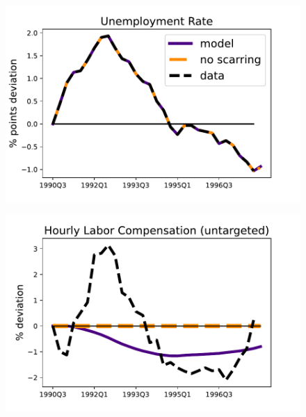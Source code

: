 \begin{figure}[H] %
\centering
\begin{minipage}{0.51\textwidth}
\includegraphics[scale=.57]{text/chapter1/Figures/90s/Urate_90s}
 \label{fig:a}
\end{minipage}\hspace*{\fill}
\begin{minipage}{0.51\textwidth}
\includegraphics[scale=.57]{text/chapter1/Figures/90s/hourly_comp_83Q1}
 \label{fig:b}
\end{minipage}


\end{figure}
